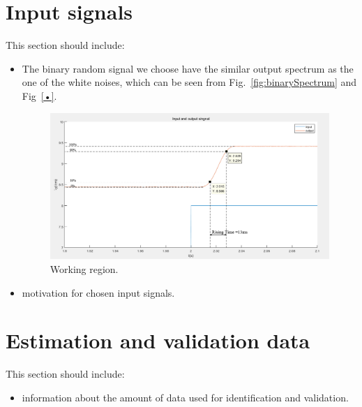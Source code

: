 \documentclass[10pt,a4paper]{article}
\begin{document}
\section{Input signals}
This section should include:
\begin{itemize}
    \item The binary random signal we choose have the similar output spectrum as the one of the white noises, which can be seen from Fig.~\ref{fig:binarySpectrum} and Fig~\ref{•}.
    \begin{figure}[h]
		\footnotesize
		\centering 
		\includegraphics[width=\columnwidth]{findSamplingTime.png} 
		\caption{Working region.}
		\label{fig:whiteNoiseSpectrum}
	\end{figure}
    \item motivation for chosen input signals.
\end{itemize}

\section{Estimation and validation data}
This section should include:
\begin{itemize}
    \item information about the amount of data used for identification and validation.
\end{itemize}

\end{document}
